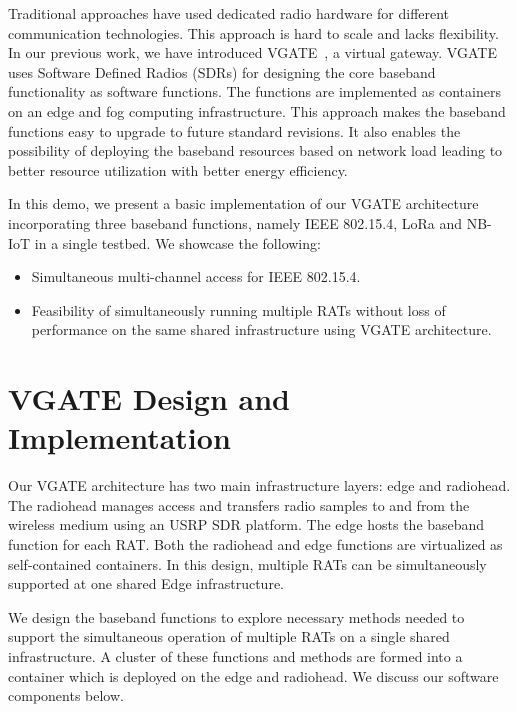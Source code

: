 \documentclass[10pt,emptycopyrightspace]{ewsn-proc}
\begin{document}
Traditional approaches have used dedicated radio hardware for different communication technologies. This approach is hard to scale and lacks flexibility. In our previous work, we have introduced VGATE~\cite{hazra2019handling}, a virtual gateway. VGATE uses Software Defined Radios (SDRs) for designing the core baseband functionality as software functions. The functions are implemented as containers on an edge and fog computing infrastructure. This approach makes the baseband functions easy to upgrade to future standard revisions.  It also enables the possibility of deploying the baseband resources based on network load leading to better resource utilization with better energy efficiency.


In this demo, we present a basic implementation of our VGATE architecture incorporating three baseband functions, namely IEEE 802.15.4, LoRa and NB-IoT in a single testbed. We showcase the following:
\begin{itemize}
	\item Simultaneous multi-channel access for IEEE 802.15.4.
	\item Feasibility of simultaneously running multiple RATs without loss of performance on the same shared infrastructure using VGATE architecture.
\end{itemize}

\section{VGATE Design and Implementation}
\label{sec:implementation}
Our VGATE architecture
has two main infrastructure layers: edge and radiohead. The radiohead manages access and transfers radio samples to and from the wireless medium using an USRP SDR platform.  The edge hosts the baseband function for each RAT. Both the radiohead and edge functions are virtualized as self-contained containers. In this design, multiple RATs can be simultaneously supported at one shared Edge
infrastructure. %


We design the baseband functions to explore necessary methods needed to support the simultaneous operation of multiple RATs on a single shared infrastructure. A cluster of these functions and methods are formed into a container which is deployed on the edge and radiohead. We discuss our software components below. 
\end{document}
